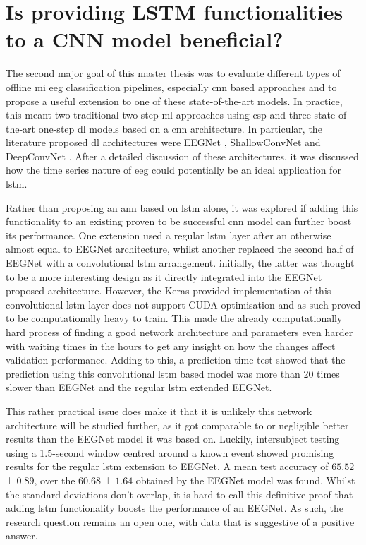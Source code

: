 \section{Is providing LSTM functionalities to a CNN model beneficial?}
\label{sec:discussion_lstm_cnn_benefit}

The second major goal of this master thesis was to evaluate different types of offline \gls{mi} \gls{eeg} classification pipelines, especially \gls{cnn} based approaches and to propose a useful extension to one of these state-of-the-art models.
In practice, this meant two traditional two-step \gls{ml} approaches using \gls{csp} and three state-of-the-art one-step \gls{dl} models based on a \gls{cnn} architecture.
In particular, the literature proposed \gls{dl} architectures were EEGNet \citep[as proposed by ][]{eeg_model_eegnet}, ShallowConvNet and DeepConvNet \citep[both proposed by ][]{eeg_model_hbm}.
After a detailed discussion of these architectures, it was discussed how the time series nature of \gls{eeg} could potentially be an ideal application for \gls{lstm}.

Rather than proposing an \gls{ann} based on \gls{lstm} alone, it was explored if adding this functionality to an existing proven to be successful \gls{cnn} model can further boost its performance.
One extension used a regular \gls{lstm} layer after an otherwise almost equal to EEGNet architecture, whilst another replaced the second half of EEGNet with a convolutional \gls{lstm} arrangement.
initially, the latter was thought to be a more interesting design as it directly integrated into the EEGNet proposed architecture.
However, the Keras-provided implementation of this convolutional \gls{lstm} layer does not support CUDA optimisation and as such proved to be computationally heavy to train. 
This made the already computationally hard process of finding a good network architecture and parameters even harder with waiting times in the hours to get any insight on how the changes affect validation performance.
Adding to this, a prediction time test showed that the prediction using this convolutional \gls{lstm} based model was more than 20 times slower than EEGNet and the regular \gls{lstm} extended EEGNet.

This rather practical issue does make it that it is unlikely this network architecture will be studied further, as it got comparable to or negligible better results than the EEGNet model it was based on.
Luckily, intersubject testing using a 1.5-second window centred around a known event showed promising results for the regular \gls{lstm} extension to EEGNet.
A mean test accuracy of  $65.52$ ± $0.89$, over the $60.68$ ± $1.64$ obtained by the EEGNet model was found.
Whilst the standard deviations don't overlap, it is hard to call this definitive proof that adding \gls{lstm} functionality boosts the performance of an EEGNet. 
As such, the research question remains an open one, with data that is suggestive of a positive answer.

